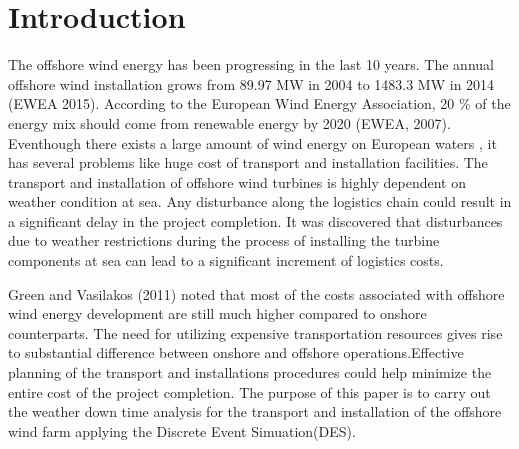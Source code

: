 \section{Introduction}
The offshore wind energy has been progressing in the last 10 years. The annual offshore wind installation grows from 89.97 MW in 2004 to 1483.3 MW in 2014 (EWEA 2015). According to the European Wind Energy Association, 20 \% of the energy mix should come from renewable energy by 2020 (EWEA, 2007). Eventhough there exists a large amount of wind energy on European waters , it has several problems like huge cost of transport and installation facilities. The transport and installation of offshore wind turbines is highly dependent on weather condition at sea. Any disturbance along the logistics chain could result in a significant delay in the project completion. It was discovered \cite{Lange2012} that disturbances due to weather restrictions during the process of installing the turbine components at sea can lead to a significant increment of logistics costs.

Green and Vasilakos (2011) noted that most of the costs associated with offshore wind energy development are still much higher compared to onshore counterparts. The need for utilizing expensive transportation resources gives rise to substantial difference between onshore and offshore operations.Effective planning of the transport and installations procedures could help minimize the entire cost of the project completion. The purpose of this paper is to carry out the weather down time analysis for the transport and installation of the offshore wind farm applying the Discrete Event Simuation(DES).